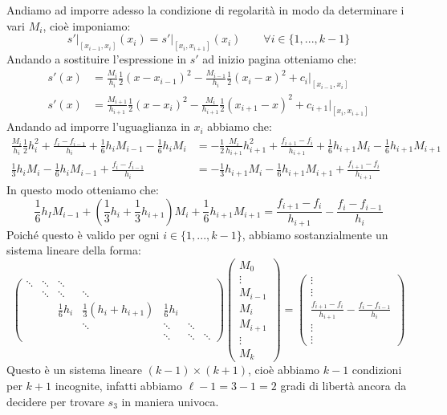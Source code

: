 \documentclass[11pt,a4paper,twoside]{article}
\theoremstyle{definition}
\begin{document}
Andiamo ad imporre adesso la condizione di regolarità in modo da determinare i vari $M_i$, cioè imponiamo:
\[ \left.s'\right|_{[x_{i-1},x_i]}(x_i) = \left. s' \right|_{[x_i, x_{i+1}]} (x_i)\qquad \forall i \in \{1,...,k-1\} \]
Andando a sostituire l'espressione in $s'$ ad inizio pagina otteniamo che:
\begin{align*}
	s'(x) &= \frac{M_i}{h_i} \frac 12 (x-x_{i-1})^2 - \frac{M_{i-1}}{h_i} \frac 12 (x_i-x)^2 + c_i|_{[x_{i-1}, x_i]}\\
	s'(x) &= \frac{M_{i+1}}{h_{i+1}} \frac 12 (x-x_{i})^2 - \frac{M_{i}}{h_{i+1}} \frac 12 (x_{i+1}-x)^2 + c_{i+1}|_{[x_{i}, x_{i+1}]}
\end{align*}
Andando ad imporre l'uguaglianza in $x_i$ abbiamo che:
\begin{align*}
	\frac{M_i}{h_i} \frac 12 h_i^2 + \frac{f_i - f_{i-1}}{h_i} + \frac 16 h_i M_{i-1} - \frac 16  h_i M_i &= - \frac 12 \frac{M_i}{h_{i+1}} h_{i+1}^2 + \frac{f_{i+1} - f_i}{h_{i+1}} + \frac 16 h_{i+1}M_i - \frac 16 h_{i+1} M_{i+1}\\
	\frac 13 h_iM_i - \frac 16 h_iM_{i-1} + \frac{f_i - f_{i-1}}{h_i} &= -\frac 13 h_{i+1}M_i - \frac 16 h_{i+1} M_{i+1} + \frac{f_{i+1} - f_i}{h_{i+1}}
\end{align*}
In questo modo otteniamo che:
\[\frac 16 h_I M_{i-1} + \left( \frac 13 h_i + \frac 13 h_{i+1} \right)M_i + \frac 16 h_{i+1}M_{i+1} = \frac{f_{i+1} - f_i}{h_{i+1}} - \frac{f_i - f_{i-1}}{h_i}\]
Poiché questo è valido per ogni $i \in \{1,...,k-1\}$, abbiamo sostanzialmente un sistema lineare della forma:
\[
	\begin{pmatrix}
		\ddots & \ddots & \ddots\\
		& \ddots & \ddots & \ddots\\
		&& \frac 16 h_i & \frac 13 (h_i + h_{i+1}) & \frac 16 h_i\\
		&&& \ddots & \ddots & \ddots\\
		&&&& \ddots & \ddots & \ddots
	\end{pmatrix}
	\begin{pmatrix}
		M_0\\ \vdots\\ M_{i-1} \\ M_i \\ M_{i+1} \\ \vdots \\ M_{k}
	\end{pmatrix} =
	\begin{pmatrix}
		\vdots \\ \vdots \\ \frac{f_{i+1} - f_i}{h_{i+1}} - \frac{f_i - f_{i-1}}{h_i} \\ \vdots \\ \vdots
	\end{pmatrix}
\]
Questo è un sistema lineare $(k-1) \times (k+1)$, cioè abbiamo $k-1$ condizioni per $k+1$ incognite, infatti abbiamo $\ell -1 = 3-1 = 2$ gradi di libertà ancora da decidere per trovare $s_3$ in maniera univoca.
\end{document}
